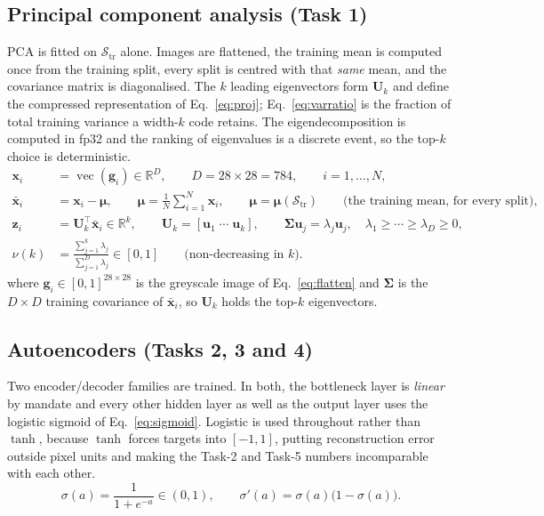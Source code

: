 \documentclass[11pt,a4paper]{article}
\newcommand{\R}{\mathbb{R}}\newcommand{\given}{\mid}\newcommand{\Acc}{\mathrm{Acc}}
\begin{document}
\subsection{Principal component analysis (Task 1)}\label{sec:arch:pca}
PCA is fitted on $\mathcal{S}_{\mathrm{tr}}$ alone.  Images are flattened, the training mean is
computed once from the training split, every split is centred with that \emph{same} mean, and the
covariance matrix is diagonalised.  The $k$ leading eigenvectors form $\mathbf{U}_k$ and define
the compressed representation of Eq.~\eqref{eq:proj}; Eq.~\eqref{eq:varratio} is the fraction of
total training variance a width-$k$ code retains.  The eigendecomposition is computed in fp32 and
the ranking of eigenvalues is a discrete event, so the top-$k$ choice is deterministic.
\begin{align}
\mathbf{x}_i &= \operatorname{vec}(\mathbf{g}_i)\in\R^{D},\qquad D=28\times28=784,
  \qquad i=1,\ldots,N, \label{eq:flatten}\\
\bar{\mathbf{x}}_i &= \mathbf{x}_i-\boldsymbol{\mu},\qquad
  \boldsymbol{\mu}=\frac{1}{N}\sum_{i=1}^{N}\mathbf{x}_i,\qquad
  \boldsymbol{\mu}=\boldsymbol{\mu}(\mathcal{S}_{\mathrm{tr}})
  \qquad\text{(the training mean, for every split)}, \label{eq:center}\\
\mathbf{z}_i &= \mathbf{U}_k^{\top}\bar{\mathbf{x}}_i\in\R^{k},\qquad
  \mathbf{U}_k=[\mathbf{u}_1\;\cdots\;\mathbf{u}_k],\qquad
  \boldsymbol{\Sigma}\mathbf{u}_j=\lambda_j\mathbf{u}_j,\quad \lambda_1\ge\cdots\ge\lambda_D\ge0,
  \label{eq:proj}\\
\nu(k) &= \frac{\sum_{j=1}^{k}\lambda_j}{\sum_{j=1}^{D}\lambda_j}\in[0,1]
  \qquad\text{(non-decreasing in $k$)}. \label{eq:varratio}
\end{align}
where $\mathbf{g}_i\in[0,1]^{28\times28}$ is the greyscale image of Eq.~\eqref{eq:flatten} and
$\boldsymbol{\Sigma}$ is the $D\times D$ training covariance of $\bar{\mathbf{x}}_i$, so
$\mathbf{U}_k$ holds the top-$k$ eigenvectors.

\subsection{Autoencoders (Tasks 2, 3 and 4)}\label{sec:arch:ae}
Two encoder/decoder families are trained.  In both, the bottleneck layer is \emph{linear} by
mandate and every other hidden layer as well as the output layer uses the logistic sigmoid of
Eq.~\eqref{eq:sigmoid}.  Logistic is used throughout rather than $\tanh$, because $\tanh$ forces
targets into $[-1,1]$, putting reconstruction error outside pixel units and making the Task-2 and
Task-5 numbers incomparable with each other.
\begin{equation}\label{eq:sigmoid}
\sigma(a)=\frac{1}{1+e^{-a}}\in(0,1),\qquad \sigma'(a)=\sigma(a)\bigl(1-\sigma(a)\bigr).
\end{equation}
\end{document}
